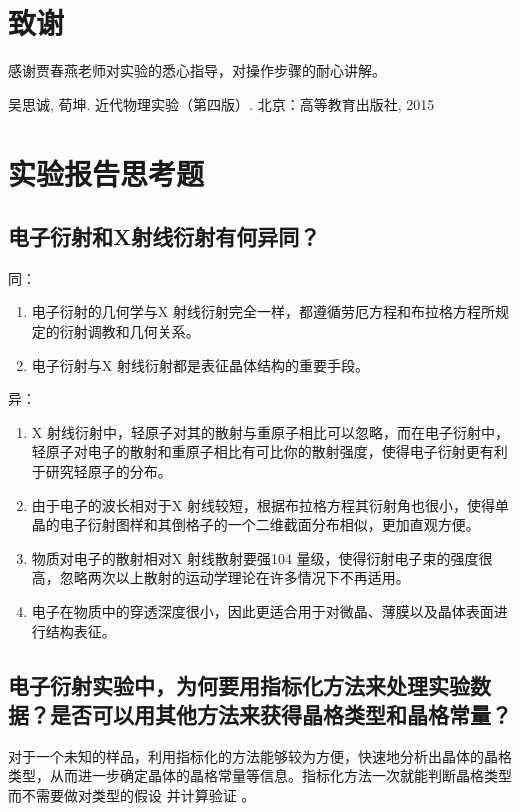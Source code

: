 \documentclass[aps,pre,12pt,preprint,onecolumn,showpacs,showkeys]{revtex4-1}
\begin{document}
\section{致谢}
    感谢贾春燕老师对实验的悉心指导，对操作步骤的耐心讲解。
	
\begin{thebibliography}{}
 吴思诚, 荀坤. 近代物理实验（第四版）. 北京：高等教育出版社, 2015
\end{thebibliography}
\clearpage
\appendix
\section{实验报告思考题}
	\subsection{电子衍射和X射线衍射有何异同？}
        同：
        \begin{enumerate}
            \item 电子衍射的几何学与X 射线衍射完全一样，都遵循劳厄方程和布拉格方程所规定的衍射调教和几何关系。
            \item 电子衍射与X 射线衍射都是表征晶体结构的重要手段。
        \end{enumerate}

        异：
        \begin{enumerate}
            \item X 射线衍射中，轻原子对其的散射与重原子相比可以忽略，而在电子衍射中，轻原子对电子的散射和重原子相比有可比你的散射强度，使得电子衍射更有利于研究轻原子的分布。
            \item 由于电子的波长相对于X 射线较短，根据布拉格方程其衍射角也很小，使得单晶的电子衍射图样和其倒格子的一个二维截面分布相似，更加直观方便。
            \item 物质对电子的散射相对X 射线散射要强104 量级，使得衍射电子束的强度很高，忽略两次以上散射的运动学理论在许多情况下不再适用。
            \item 电子在物质中的穿透深度很小，因此更适合用于对微晶、薄膜以及晶体表面进行结构表征。
        \end{enumerate}

        
	
    \subsection{电子衍射实验中，为何要用指标化方法来处理实验数据？是否可以用其他方法来获得晶格类型和晶格常量？}
        对于一个未知的样品，利用指标化的方法能够较为方便，快速地分析出晶体的晶格类型，从而进一步确定晶体的晶格常量等信息。指标化方法一次就能判断晶格类型而不需要做对类型的假设 并计算验证 。
		
	
\end{document}
